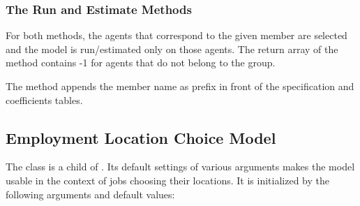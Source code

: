 \subsubsection{The Run and Estimate Methods}
%
For both methods, the agents that correspond to the given member are selected and the model is run/estimated only
on those agents. The return array of the  method contains -1 for agents that do not belong to the group.

The  method appends the member name as prefix in front of the specification and coefficients tables.

\subsection{Employment Location Choice Model}
\label{sec:elcm} 
%
The class   
is a child of . 
Its default settings
of various arguments makes the model usable in the context of jobs choosing their locations.
It is initialized by the following arguments and default values:
